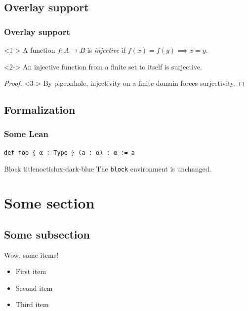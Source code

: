 \documentclass[aspectratio=169, noamssymb]{beamer}
\begin{document}
\subsection{Overlay support}

\begin{frame}
  \frametitle{Overlay support}
  \begin{definition}<1->
    A function $f : A \to B$ is \emph{injective} if
    $f(x) = f(y) \implies x = y$.
  \end{definition}
  \begin{theorem}<2->
    An injective function from a finite set to itself is surjective.
  \end{theorem}
  \begin{proof}<3->
    By pigeonhole, injectivity on a finite domain forces surjectivity.
  \end{proof}
\end{frame}

\subsection{Formalization}

\begin{frame}[fragile]
  \frametitle{Some Lean}
\begin{lstlisting}[language=lean]
def foo { α : Type } (a : α) : α := a
\end{lstlisting}
  \begin{block}{Block title}{noctislux-dark-blue}
    The \texttt{block} environment is unchanged.
  \end{block}
\end{frame}

\section{Some section}

\subsection{Some subsection}

\begin{frame}{\secname}{\subsecname}
  Wow, some items!
  \pause
  \begin{itemize}[<+->]
    \item First item
    \item Second item
    \item Third item
  \end{itemize}
\end{frame}
\end{document}
